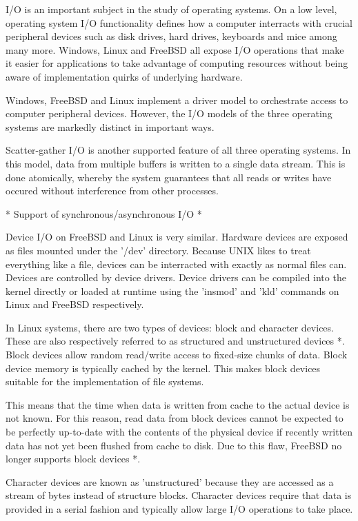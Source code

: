 I/O is an important subject in the study of operating systems.  On a low level, operating system I/O functionality defines how a computer interracts with crucial peripheral devices such as disk drives, hard drives, keyboards and mice among many more.  Windows, Linux and FreeBSD all expose I/O operations that make it easier for applications to take advantage of computing resources without being aware of implementation quirks of underlying hardware.

Windows, FreeBSD and Linux implement a driver model to orchestrate access to computer peripheral devices.  However, the I/O models of the three operating systems are markedly distinct in important ways.

	Scatter-gather I/O is another supported feature of all three operating systems.  In this model, data from multiple buffers is written to a single data stream.  This is done atomically, whereby the system guarantees that all reads or writes have occured without interference from other processes. 

* Support of synchronous/asynchronous I/O *

Device I/O on FreeBSD and Linux is very similar.  Hardware devices are exposed as files mounted under the '/dev' directory.  Because UNIX likes to treat everything like a file, devices can be interracted with exactly as normal files can.  Devices are controlled by device drivers.  Device drivers can be compiled into the kernel directly or loaded at runtime using the 'insmod' and 'kld' commands on Linux and FreeBSD respectively.

In Linux systems, there are two types of devices: block and character devices.  These are also respectively referred to as structured and unstructured devices *.  Block devices allow random read/write access to fixed-size chunks of data.  Block device memory is typically cached by the kernel.  This makes block devices suitable for the implementation of file systems.

  This means that the time when data is written from cache to the actual device is not known.  For this reason, read data from block devices cannot be expected to be perfectly up-to-date with the contents of the physical device if recently written data has not yet been flushed from cache to disk.  Due to this flaw, FreeBSD no longer supports block devices *.

  Character devices are known as 'unstructured' because they are accessed as a stream of bytes instead of structure blocks.
  Character devices require that data is provided in a serial fashion and typically allow large I/O operations to take place.


